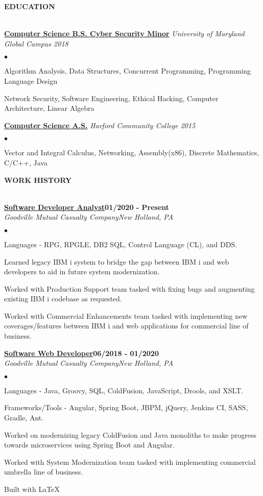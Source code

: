 \documentclass{article}
\newcommand{\lineunder}{
	\vspace*{-4pt}\\ 
	\hspace*{-18pt}\hrulefill \\
}
\newcommand{\header}[1]{
	{\hspace*{-15pt}\vspace*{6pt}\textsc{#1}}\vspace*{-6pt}\lineunder
}
\newcommand{\employer}[4]{
	{\underline{\textbf{#1}}{\hfill\textbf{#2}}\\ 
	\vspace*{2pt}\textit{#3}\hfill \textit{#4}\\}
}
\newcommand{\education}[2]{
	\textbf{\underline{{#1}}} \textit{#2}\vspace*{3pt}
}
\newenvironment{resumecontent}{
	\begin{list}
		{\small$\bullet$}{\topsep 0pt \itemsep -2pt}}{\vspace*{4pt}
	\end{list}
}
\newcommand{\resumeheader}[1]{
	\vspace*{10pt}
	\header{\textbf{#1}}
    \vspace*{5pt}
}
\begin{document}
	\resumeheader{EDUCATION}
		\education {Computer Science B.S. Cyber Security Minor}{University of Maryland Global Campus 2018}
            \begin{resumecontent}
                \item Algorithm Analysis, Data Structures, Concurrent Programming, Programming Language Design
                \item Network Security, Software Engineering, Ethical Hacking, Computer Architecture, Linear Algebra
            \end{resumecontent}
            \vspace*{3pt}
		\education {Computer Science A.S.}{Harford Community College 2015}
            \begin{resumecontent}
                \item Vector and Integral Calculus, Networking, Assembly(x86), Discrete Mathematics, C/C++, Java
            \end{resumecontent}

	\resumeheader{WORK HISTORY}
        \employer{Software Developer Analyst}{01/2020 - Present}{Goodville Mutual Casualty Company}{New Holland, PA}
            \vspace*{2pt}
			\begin{resumecontent}
                \item Languages - RPG, RPGLE, DB2 SQL, Control Language (CL), and DDS.
				\item Learned legacy IBM i system to bridge the gap between IBM i and web developers to aid in future system modernization.
                \item Worked with Production Support team tasked with fixing bugs and augmenting existing IBM i codebase as requested.
                \item Worked with Commercial Enhancements team tasked with implementing new coverages/features between IBM i and web applications for commercial line of business.
			\end{resumecontent}
            \vspace*{4pt}
		\employer{Software Web Developer}{06/2018 - 01/2020}{Goodville Mutual Casualty Company}{New Holland, PA}
            \vspace*{2pt}
			\begin{resumecontent}
                \item Languages - Java, Groovy, SQL, ColdFusion, JavaScript, Drools, and XSLT.
                \item Frameworks/Tools - Angular, Spring Boot, JBPM, jQuery, Jenkins CI, SASS, Gradle, Ant.
				\item Worked on modernizing legacy ColdFusion and Java monoliths to make progress towards microservices using Spring Boot and Angular.
				\item Worked with System Modernization team tasked with implementing commercial umbrella line of business.
			\end{resumecontent}

	\begin{center}
		\small 
		\vspace*{35pt} Built with \LaTeX
	\end{center}
\end{document}
